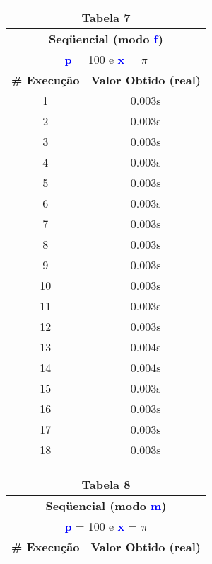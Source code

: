\documentclass[11pt]{article}
\begin{document}
\begin{table}[!h]
	\begin{center}
		\begin{minipage}{0.48\textwidth}
			\begin{tabular}{| c | c |}
			\hline
			\multicolumn{2}{|c|}{\textbf{Tabela 7}} \\ \hline
			\multicolumn{2}{|c|}{\textbf{Seqüencial (modo \textbf{\textcolor{blue}{f}})}} \\
			\multicolumn{2}{|c|}{\textbf{\textcolor{blue}{p}} = 100 e \textbf{\textcolor{blue}{x}} = $\pi$} \\ [0.2ex]
			\hline
				\textbf{\# Execução} &  \textbf{Valor Obtido (real)} \\ \hline
				1 & 0.003s \\ \hline
				2 & 0.003s \\ \hline
				3 & 0.003s \\ \hline
				4 & 0.003s \\ \hline
				5 & 0.003s \\ \hline
				6 & 0.003s \\ \hline
				7 & 0.003s \\ \hline
				8 & 0.003s \\ \hline
				9 & 0.003s \\ \hline
				10 & 0.003s \\ \hline
				11 & 0.003s \\ \hline
				12 & 0.003s \\ \hline
				13 & 0.004s \\ \hline
				14 & 0.004s \\ \hline
				15 & 0.003s \\ \hline
				16 & 0.003s \\ \hline
				17 & 0.003s \\ \hline
				18 & 0.003s \\ \hline
			\end{tabular}
		\end{minipage}
		\begin{minipage}{0.48\textwidth}
			\begin{tabular}{| c | c |}
			\hline
			\multicolumn{2}{|c|}{\textbf{Tabela 8}} \\ \hline
			\multicolumn{2}{|c|}{\textbf{Seqüencial (modo \textbf{\textcolor{blue}{m}})}} \\
			\multicolumn{2}{|c|}{\textbf{\textcolor{blue}{p}} = 100 e \textbf{\textcolor{blue}{x}} = $\pi$} \\ [0.2ex]
			\hline
				\textbf{\# Execução} &  \textbf{Valor Obtido (real)} \\ \hline

\end{tabular}
\end{minipage}
\end{center}
\end{table}
\end{document}
